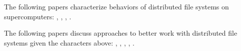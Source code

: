 
The following papers characterize behaviors of distributed file systems
on supercomputers:
\cite{Xie2012}, \cite{Henschel2012}, \cite{Crosby2009}, \cite{Borrill2009}.

The following papers discuss approaches to better work with distributed 
file systems given the characters above:
\cite{Shipman2010}, \cite{Yu2006}, \cite{Tian2011}, \cite{Lofstead2010},
\cite{Lofstead2009}.
